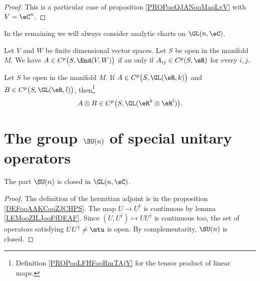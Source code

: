 \begin{proof}
	This is a particular case of proposition \ref{PROPooQJANooMaqLvV} with \( V=\eC^n\).
\end{proof}


In the remaining we will always consider analytic charts on \( \GL(n,\eC)\).

\begin{proposition}		\label{PROPooRRNXooXJZYSB}
	Let \( V\) and \( W\) be finite dimensional vector spaces. Let \( S\) be open in the manifold \( M\). We have \( A\in C^p\big( S,\End(V,W) \big) \) if an only if \( A_{ij}\in C^p(S,\eR)\) for every \( i,j\).
\end{proposition}
\noproof

\begin{proposition}		\label{PROPooLANVooKPiLuu}
	Let \( S\) be open in the manifold \( M\). If \( A\in C^{p}\big( S,\GL(\eR,k) \big)\) and \( B\in C^{p}\big( S,\GL(\eR,l) \big)\), then\footnote{Definition \ref{PROPooLFHFooRmTAjY} for the tensor product of linear maps.}
	\begin{equation}
		A\otimes B\in C^{p}\big( S,\GL(\eR^k\otimes \eR^l) \big).
	\end{equation}
\end{proposition}
\noproof

\section{The group \texorpdfstring{$ \SU(n)$}{SUn} of special unitary operators}

\begin{lemma}        \label{LEMooKFQOooBVtyoW}
	The part \( \SU(n)\) is closed in \( \GL(n,\eC)\).
\end{lemma}

\begin{proof}
	The definition of the hermitian adjoint is in the proposition \ref{DEFooAAKCooZJCHPS}. The map \( U\to U^{\dag}\) is continuous by lemma \ref{LEMooZILJooFfDEAF}. Since \( (U,U^{\dag})\mapsto UU^{\dag}\) is continuous too, the set of operators satisfying \( UU^{\dag}\neq\mtu\) is open. By complementarity, \( \SU(n)\) is closed.
\end{proof}

